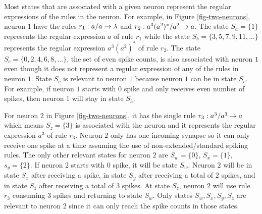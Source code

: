 \documentclass[runningheads,a4paper]{llncs}
\begin{document}
Most states that are associated with a given neuron represent the regular expressions of the rules
in the neuron. For example, in Figure \ref{fig-two-neurons}, neuron $1$ have the rules
$r_1: a/a \rightarrow \lambda$ and  $r_2: a^3(a^2)^*/a^2 \rightarrow a$. The state $S_a=\{1\}$ represents the
regular expression $a$ of rule $r_1$ while the state $S_b=\{3,5,7,9,11,...\}$ represents the regular 
expression $a^3(a^2)^*$ of rule $r_2$. The state $S_c = \{0,2,4,6,8,...\}$, the set of even spike
counts, is also associated with neuron $1$ even though it does not represent a regular expression of
any of the rules in neuron $1$. State $S_c$ is relevant to neuron $1$ because neuron $1$ can be in
state $S_c$. For example, if neuron $1$ starts with $0$ spike and only receives even number of
spikes, then neuron $1$ will stay in state $S_3$.

For neuron $2$ in Figure \ref{fig-two-neurons}, it has the single rule $r_3: a^3/a^3 \rightarrow a$ which 
means $S_z = \{3\}$ is associated with the neuron and it represents the regular expression $a^3$ of 
rule $r_3$. Neuron $2$ only has one incoming synapse so it can only receive one spike at a time 
assuming the use of non-extended/standard spiking rules. The only other relevant states for neuron 
$2$ are $S_w=\{0\}$, $S_x=\{1\}$, $s_y=\{2\}$. If neuron $2$ starts with $0$ spike, it will be state 
$S_w$. Neuron $2$ will be in state $S_x$ after receiving a spike, in state $S_y$ after receiving a 
total of $2$ spikes, and in state $S_z$ after receiving a total of $3$ spikes. At state $S_z$, 
neuron $2$ will use rule $r_3$ consuming $3$ spikes and  returning to state $S_w$. Only states
$S_w, S_x, S_y, S_z$ are relevant to neuron $2$ since it can only reach the spike counts in those
states.
\end{document}
